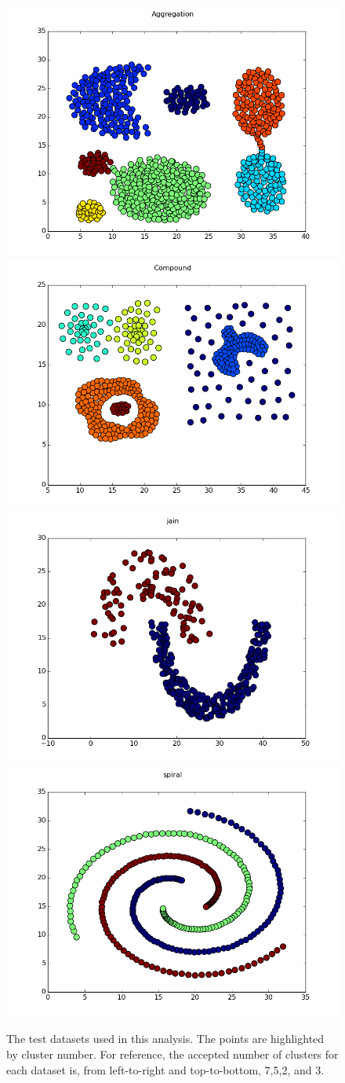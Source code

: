 \documentclass[12pt]{article}
\begin{document}
\begin{figure}[ht]
\centering
\includegraphics[width=0.47\linewidth]{../plots/datasets/Aggregation}
\includegraphics[width=0.47\linewidth]{../plots/datasets/Compound} \\
\includegraphics[width=0.47\linewidth]{../plots/datasets/jain}
\includegraphics[width=0.47\linewidth]{../plots/datasets/spiral}
\caption{The test datasets used in this analysis. The points are highlighted by cluster number. For reference, the accepted number of clusters for each dataset is, from left-to-right and top-to-bottom, 7,5,2, and 3.}
\label{fig:distributions}
\end{figure}
\end{document}
